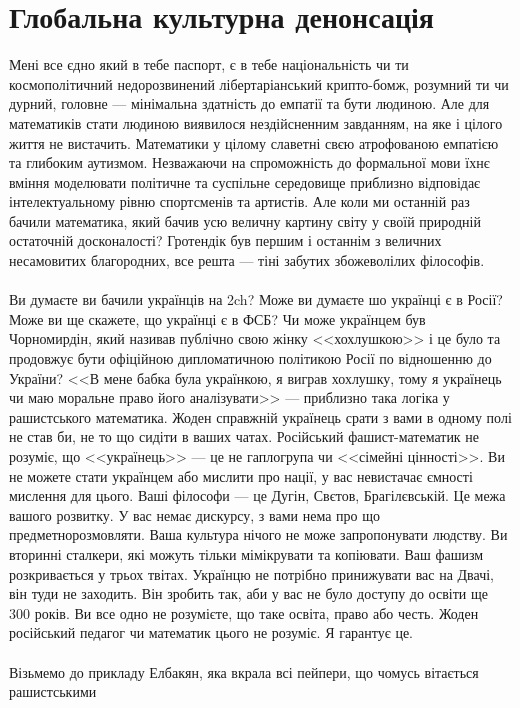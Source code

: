\section{Глобальна культурна денонсація}

Мені все єдно який в тебе паспорт, є в тебе національність чи ти космополітичний
недорозвинений лібертаріанський крипто-бомж, розумний ти чи дурний, головне ---
мінімальна здатність до емпатії та бути людиною.
Але для математиків стати людиною виявилося нездійсненним завданням, на яке і цілого
життя не вистачить. Математики у цілому славетні свєю атрофованою емпатією та
глибоким аутизмом. Незважаючи на спроможність до формальної мови їхнє вміння
моделювати політичне та суспільне середовище приблизно відповідає інтелектуальному
рівню спортсменів та артистів. Але коли ми останній раз бачили математика, який
бачив усю величну картину світу у своїй природній остаточній досконалості?
Гротендік був першим і останнім з величних несамовитих благородних,
все решта --- тіні забутих збожеволілих філософів.
\\
\\
Ви думаєте ви бачили українців на 2ch? Може ви думаєте шо українці є в Росії?
Може ви ще скажете, що українці є в ФСБ? Чи може українцем був Чорномирдін,
який називав публічно свою жінку <<хохлушкою>> і це було та продовжує бути офіційною
дипломатичною політикою Росії по відношенню до України? <<В мене бабка була українкою,
я виграв хохлушку, тому я українець чи маю моральне право його аналізувати>> ---
приблизно така логіка у рашистського математика. Жоден справжній українець срати
з вами в одному полі не став би, не то що сидіти в ваших чатах. Російський фашист-математик
не розуміє, що <<українець>> --- це не гаплогрупа чи <<сімейні цінності>>.
Ви не можете стати українцем або мислити про нації, у вас невистачає ємності
мислення для цього. Ваші філософи --- це Дугін, Свєтов, Брагілєвській.
Це межа вашого розвитку. У вас немає дискурсу, з вами нема про що предметнорозмовляти.
Ваша культура нічого не може запропонувати людству. Ви вторинні сталкери,
які можуть тільки мімікрувати та копіювати. Ваш фашизм розкривається у трьох твітах.
Українцю не потрібно принижувати вас на Двачі, він туди не заходить. Він зробить так,
аби у вас не було доступу до освіти ще 300 років. Ви все одно не розумієте, що таке
освіта, право або честь. Жоден російський педагог чи математик цього не розуміє.
Я гарантує це.
\\
\\
Візьмемо до прикладу Елбакян, яка вкрала всі пейпери, що чомусь вітається рашистськими
